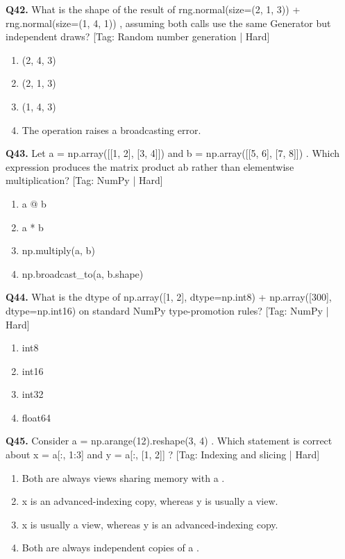 \vspace{2mm}
\noindent\textbf{Q42.} What is the shape of the result of rng.normal(size=(2, 1, 3)) + rng.normal(size=(1, 4, 1)) , assuming both calls use the same Generator but independent draws? \hfill [Tag: Random number generation | Hard]
\begin{enumerate}[label=(\alph*),topsep=2pt,itemsep=1pt,partopsep=0pt,parsep=0pt]
    \item {(2, 4, 3)}
    \item {(2, 1, 3)}
    \item {(1, 4, 3)}
    \item {The operation raises a broadcasting error.}
\end{enumerate}
\vspace{2mm}
\noindent\textbf{Q43.} Let a = np.array([[1, 2], [3, 4]]) and b = np.array([[5, 6], [7, 8]]) . Which expression produces the matrix product ab rather than elementwise multiplication? \hfill [Tag: NumPy | Hard]
\begin{enumerate}[label=(\alph*),topsep=2pt,itemsep=1pt,partopsep=0pt,parsep=0pt]
    \item {a @ b}
    \item {a * b}
    \item {np.multiply(a, b)}
    \item {np.broadcast\_to(a, b.shape)}
\end{enumerate}
\vspace{2mm}
\noindent\textbf{Q44.} What is the dtype of np.array([1, 2], dtype=np.int8) + np.array([300], dtype=np.int16) on standard NumPy type-promotion rules? \hfill [Tag: NumPy | Hard]
\begin{enumerate}[label=(\alph*),topsep=2pt,itemsep=1pt,partopsep=0pt,parsep=0pt]
    \item {int8}
    \item {int16}
    \item {int32}
    \item {float64}
\end{enumerate}
\vspace{2mm}
\noindent\textbf{Q45.} Consider a = np.arange(12).reshape(3, 4) . Which statement is correct about x = a[:, 1:3] and y = a[:, [1, 2]] ? \hfill [Tag: Indexing and slicing | Hard]
\begin{enumerate}[label=(\alph*),topsep=2pt,itemsep=1pt,partopsep=0pt,parsep=0pt]
    \item {Both are always views sharing memory with a .}
    \item {x is an advanced-indexing copy, whereas y is usually a view.}
    \item {x is usually a view, whereas y is an advanced-indexing copy.}
    \item {Both are always independent copies of a .}
\end{enumerate}
